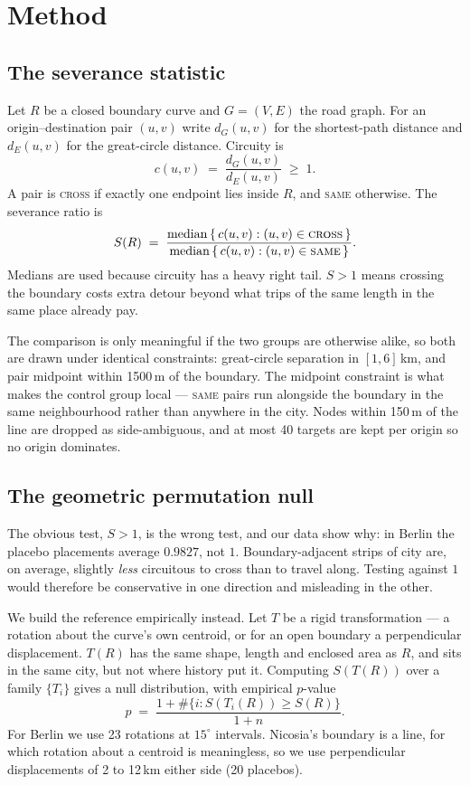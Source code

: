 \documentclass[11pt,a4paper]{article}
\begin{document}
\section{Method}

\subsection{The severance statistic}\label{sec:stat}

Let $R$ be a closed boundary curve and $G=(V,E)$ the road graph. For an
origin--destination pair $(u,v)$ write $d_G(u,v)$ for the shortest-path distance
and $d_E(u,v)$ for the great-circle distance. Circuity is
\[
  c(u,v) \;=\; \frac{d_G(u,v)}{d_E(u,v)} \;\ge\; 1 .
\]
A pair is \textsc{cross} if exactly one endpoint lies inside $R$, and
\textsc{same} otherwise. The severance ratio is
\[
  S(R) \;=\; \frac{\operatorname{median}\,\{\,c(u,v) : (u,v)\in\textsc{cross}\,\}}
                  {\operatorname{median}\,\{\,c(u,v) : (u,v)\in\textsc{same}\,\}} .
\]
Medians are used because circuity has a heavy right tail. $S>1$ means crossing
the boundary costs extra detour beyond what trips of the same length in the same
place already pay.

The comparison is only meaningful if the two groups are otherwise alike, so both
are drawn under identical constraints: great-circle separation in
$[1, 6]$\,km, and pair midpoint within 1500\,m of the
boundary. The midpoint constraint is what makes the control group local ---
\textsc{same} pairs run alongside the boundary in the same neighbourhood rather
than anywhere in the city. Nodes within 150\,m of the line are dropped
as side-ambiguous, and at most 40 targets are kept per origin so no
origin dominates.

\subsection{The geometric permutation null}\label{sec:null}

The obvious test, $S>1$, is the wrong test, and our data show why: in Berlin the
placebo placements average $0.9827$, not $1$. Boundary-adjacent
strips of city are, on average, slightly \emph{less} circuitous to cross than to
travel along. Testing against $1$ would therefore be conservative in one
direction and misleading in the other.

We build the reference empirically instead. Let $T$ be a rigid transformation
--- a rotation about the curve's own centroid, or for an open boundary a
perpendicular displacement. $T(R)$ has the same shape, length and enclosed area
as $R$, and sits in the same city, but not where history put it. Computing
$S(T(R))$ over a family $\{T_i\}$ gives a null distribution, with empirical
$p$-value
\[
  p \;=\; \frac{1 + \#\{ i : S(T_i(R)) \ge S(R) \}}{1 + n} .
\]
For Berlin we use 23 rotations at $15^{\circ}$ intervals. Nicosia's
boundary is a line, for which rotation about a centroid is meaningless, so we
use perpendicular displacements of 2 to 12\,km either side
(20 placebos).
\end{document}

